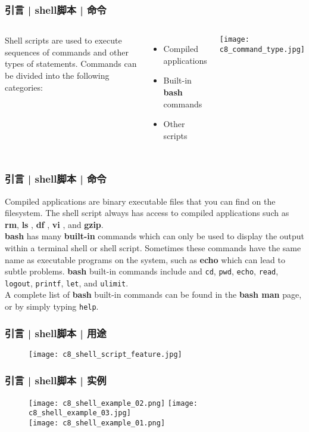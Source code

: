 \begin{frame}
  \frametitle{引言 | shell脚本 | 命令}
  \begin{columns}
  Shell scripts are used to execute sequences of commands and other types of statements. Commands can be divided into the following categories:
  \begin{itemize}
    \item Compiled applications
    \item Built-in \textbf{bash} commands
    \item Other scripts
  \end{itemize}
    \texttt{[image: c8\_command\_type.jpg]}
  \end{columns}
\end{frame}

\begin{frame}[fragile]
  \frametitle{引言 | shell脚本 | 命令}
  Compiled applications are binary executable files that you can find on
  the filesystem. The shell script always has access to compiled
  applications such as \textbf{rm}, \textbf{ls} , \textbf{df} ,
  \textbf{vi} , and \textbf{gzip}.\\
  \vspace{0.3cm}
  \textbf{bash} has many \textbf{built-in} commands which can only be used to display the output within a terminal shell or shell script. Sometimes these commands have the same name as executable programs on the system, such as \textbf{echo} which can lead to subtle problems. \textbf{bash} built-in commands include and \verb|cd|, \verb|pwd|, \verb|echo|, \verb|read|, \verb|logout|, \verb|printf|, \verb|let|, and \verb|ulimit|.\\
  \vspace{0.3cm}
  A complete list of \textbf{bash} built-in commands can be found in the \textbf{bash man} page, or by simply typing \verb|help|.
\end{frame}

\begin{frame}
  \frametitle{引言 | shell脚本 | 用途}
  \begin{figure}
    \centering
    \texttt{[image: c8\_shell\_script\_feature.jpg]}
  \end{figure}
\end{frame}

\begin{frame}
  \frametitle{引言 | shell脚本 | 实例}
  \begin{figure}
    \centering
    \texttt{[image: c8\_shell\_example\_02.png]}\quad
    \texttt{[image: c8\_shell\_example\_03.jpg]}\\
    \vspace{0.5cm}
    \texttt{[image: c8\_shell\_example\_01.png]}
  \end{figure}
\end{frame}

